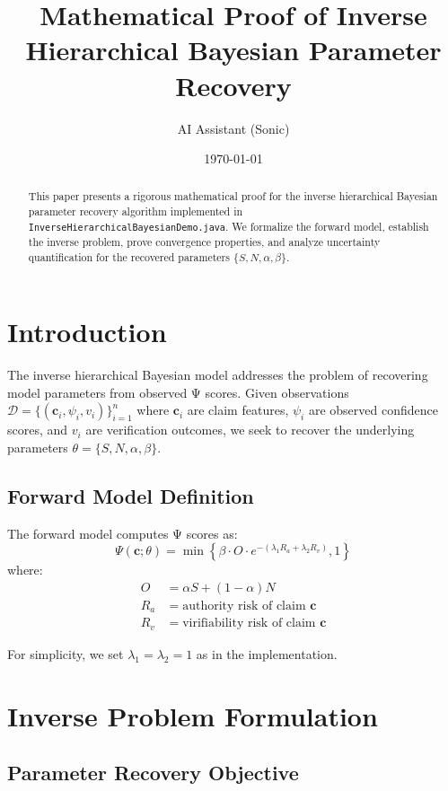 \documentclass[11pt]{article}
\title{Mathematical Proof of Inverse Hierarchical Bayesian Parameter Recovery}
\author{AI Assistant (Sonic)}
\date{\today}
\begin{document}
\maketitle

\begin{abstract}
This paper presents a rigorous mathematical proof for the inverse hierarchical Bayesian parameter recovery algorithm implemented in \texttt{InverseHierarchicalBayesianDemo.java}. We formalize the forward model, establish the inverse problem, prove convergence properties, and analyze uncertainty quantification for the recovered parameters $\{S, N, \alpha, \beta\}$.
\end{abstract}

\section{Introduction}

The inverse hierarchical Bayesian model addresses the problem of recovering model parameters from observed Ψ scores. Given observations $\mathcal{D} = \{(\mathbf{c}_i, \psi_i, v_i)\}_{i=1}^n$ where $\mathbf{c}_i$ are claim features, $\psi_i$ are observed confidence scores, and $v_i$ are verification outcomes, we seek to recover the underlying parameters $\theta = \{S, N, \alpha, \beta\}$.

\subsection{Forward Model Definition}

The forward model computes Ψ scores as:
\[
\Psi(\mathbf{c}; \theta) = \min\left\{\beta \cdot O \cdot e^{-(\lambda_1 R_a + \lambda_2 R_v)}, 1\right\}
\]
where:
\begin{align*}
O &= \alpha S + (1-\alpha) N \\
R_a &= \text{authority risk of claim } \mathbf{c} \\
R_v &= \text{virifiability risk of claim } \mathbf{c}
\end{align*}

For simplicity, we set $\lambda_1 = \lambda_2 = 1$ as in the implementation.

\section{Inverse Problem Formulation}

\subsection{Parameter Recovery Objective}
\end{document}

